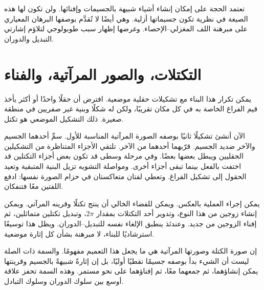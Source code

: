\begin{classroomqa}
\end{classroomqa}

تعتمد الحجة على إمكان إنشاء أشياء شبيهة بالجسيمات وإفنائها. ولن تكون لها هذه الصيغة في نظرية تكون جسيماتها أزلية. وهي أيضًا لا تُقدَّم بوصفها البرهان المعياري على مبرهنة اللف المغزلي--الإحصاء. وغرضها إظهار سبب طوبولوجي لتلاؤم إشارتي التبديل والدوران.

\section{التكتلات، والصور المرآتية، والفناء}

يمكن تكرار هذا البناء مع تشكيلات حقلية موضعية. افترض أن حقلًا واحدًا أو أكثر يأخذ قيم الفراغ الخاصة به في كل مكان تقريبًا، ولكن له شكلًا وبنية غير صفريين في منطقة صغيرة. ذلك التشكيل الموضعي هو تكتل.

الآن أنشئ تشكيلًا ثانيًا بوصفه الصورة المرآتية المناسبة للأول. سمِّ أحدهما الجسيم والآخر ضديد الجسيم. قرّبهما أحدهما من الآخر. تلتقي الأجزاء المتناظرة من التشكيلين الحقليين ويبطل بعضها بعضًا. وفي مرحلة وسطى قد تكون بعض أجزاء التكتلين قد اختفت بالفعل بينما تبقى أجزاء أخرى. ومواصلة التشويه تزيل البنية المتبقية وتعيد الحقول إلى تشكيل الفراغ. وتعطي لفتان متعاكستان في حزام الصورة نفسها: ادفع اللفتين معًا فتنفكان.

يمكن إجراء العملية بالعكس. ويمكن للفضاء الخالي أن ينتج تكتلًا وقرينه المرآتي. ويمكن إنشاء زوجين من هذا النوع، وتدوير أحد التكتلات بمقدار \(2\pi\)، وتبديل تكتلين متماثلين، ثم إفناء الزوجين من جديد. وعندئذ ينطبق الإلغاء نفسه للتبديل--الدوران. ويظل هذا توسيعًا استرشاديًا للبناء، لا مبرهنة بشأن كل إثارة موضعية.

\begin{classroomqa}
\end{classroomqa}

إن صورة الكتلة وصورتها المرآتية هي ما يجعل هذا التعميم مفهومًا. والسمة ذات الصلة ليست أن الشيء بدأ بوصفه جسيمًا نقطيًا أوليًا، بل إن إثارةً شبيهةً بالجسيم وقرينتها يمكن إنشاؤهما، ثم جمعهما معًا، ثم إفناؤهما على نحو مستمر. وهذه السمة تحفز علاقة أوسع بين سلوك الدوران وسلوك التبادل.

